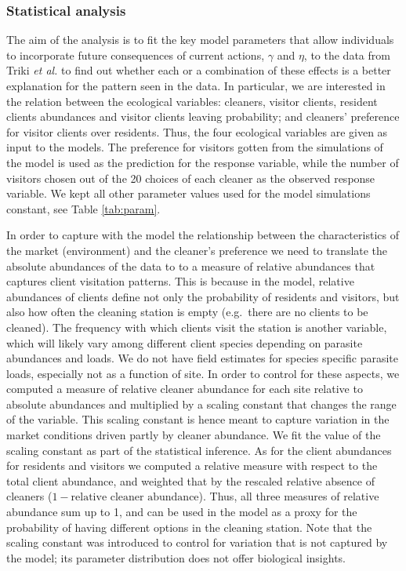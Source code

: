 \documentclass[]{rsos}%
\begin{document}
\hypertarget{statistical-analysis}{%
\subsubsection{Statistical analysis}\label{statistical-analysis}}

The aim of the analysis is to fit the key model parameters that allow
individuals to incorporate future consequences of current actions,
\(\gamma\) and \(\eta\), to the data from Triki \emph{et al.}
\citep{triki_Biological_2019, triki_Brain_2020} to find out whether each or
a combination of these effects is a better explanation for the pattern
seen in the data. In particular, we are interested in the relation between the
ecological variables: cleaners, visitor clients, resident clients abundances and
visitor clients leaving probability; and cleaners' preference for visitor clients
over residents. Thus, the four ecological variables are given as input to
the models. The preference for visitors gotten from the simulations of the model
is used as the prediction for the response variable, while the number of visitors
chosen out of the 20 choices of each cleaner as the observed response variable.
We kept all other parameter values used for the model simulations constant,
see Table \ref{tab:param}.

In order to capture with the model the relationship between the characteristics
of the market (environment) and the cleaner's preference we need to translate
the absolute abundances of the data to to a measure of relative abundances
that captures client visitation patterns. This is because in the model, relative
abundances of clients define not only the probability of residents and visitors,
but also how often the cleaning station is empty (e.g.~there are no
clients to be cleaned). The frequency with which clients visit the station
is another variable, which will likely vary among different client species
depending on parasite abundances and loads. We do not have field estimates
for species specific parasite loads, especially not as a function of site.
In order to control for these aspects, we computed a measure of relative
cleaner abundance for each site relative to absolute abundances and multiplied
by a scaling constant that changes the range of the variable. This scaling
constant is hence meant to capture variation in the market conditions driven
partly by cleaner abundance. We fit the value of the scaling constant as
part of the statistical inference. As for the client abundances for
residents and visitors we computed a relative measure with respect to the
total client abundance, and weighted that by the rescaled relative absence
of cleaners (\(1-\text{relative cleaner abundance}\)). Thus, all three measures
of relative abundance sum up to 1, and can be used in the model as a proxy
for the probability of having different options in the cleaning station.
Note that the scaling constant was introduced to control for variation that
is not captured by the model; its parameter distribution does not offer
biological insights.
\end{document}

